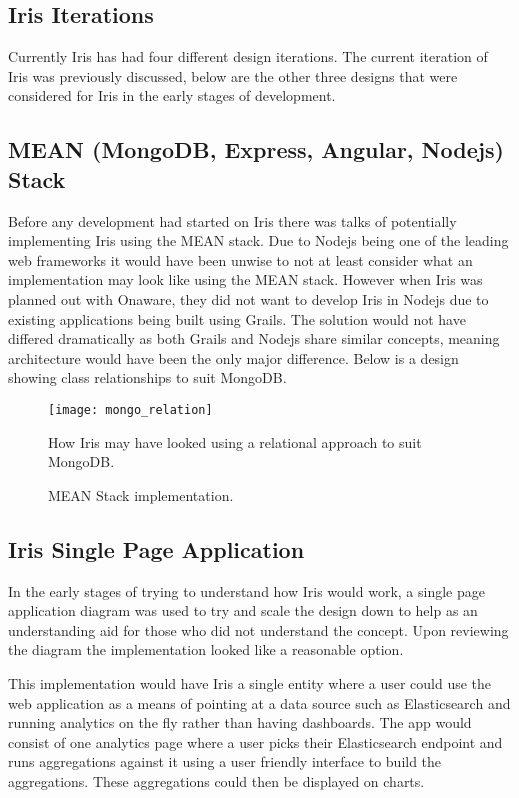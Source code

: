 \documentclass[12pt,a4paper,titlepage]{report}
\begin{document}
\begin{appendices}

\chapter{Iris Iterations}\label{sec:iterations}

Currently Iris has had four different design iterations. The current iteration of Iris was previously discussed, below are the other three designs that were considered for Iris in the early stages of development.

\section{MEAN (MongoDB, Express, Angular, Nodejs) Stack}

Before any development had started on Iris there was talks of potentially implementing Iris using the MEAN stack. Due to Nodejs being one of the leading web frameworks it would have been unwise to not at least consider what an implementation may look like using the MEAN stack. However when Iris was planned out with Onaware, they did not want to develop Iris in Nodejs due to existing applications being built using Grails. The solution would not have differed dramatically as both Grails and Nodejs share similar concepts, meaning architecture would have been the only major difference. Below is a design showing class relationships to suit MongoDB.

\begin{figure}[H]
\begin{tcolorbox}
\centerline{\texttt{[image: mongo\_relation]}}
How Iris may have looked using a relational approach to suit MongoDB.
\end{tcolorbox}
\caption{MEAN Stack implementation.}
\end{figure}

\section{Iris Single Page Application}

In the early stages of trying to understand how Iris would work, a single page application diagram was used to try and scale the design down to help as an understanding aid for those who did not understand the concept. Upon reviewing the diagram the implementation looked like a reasonable option. 

This implementation would have Iris a single entity where a user could use the web application as a means of pointing at a data source such as Elasticsearch and running analytics on the fly rather than having dashboards. The app would consist of one analytics page where a user picks their Elasticsearch endpoint and runs aggregations against it using a user friendly interface to build the aggregations. These aggregations could then be displayed on charts.


\end{appendices}
\end{document}
